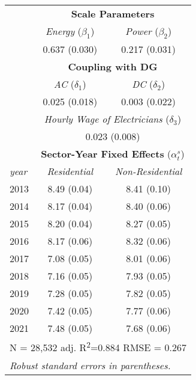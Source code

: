 \begin{tabular}{lcc} \hline
\Tstrut                       & \multicolumn{2}{c}{\textbf{Scale Parameters}}                    \\ \cline{2-3} 
\Tstrut   \Bstrut                    & \textit{Energy} ($\beta_1$)             & \textit{Power} ($\beta_2$)              \\
                      & 0.637 (0.030)                    & 0.217 (0.031)                     \\
[0.5em]
  & \multicolumn{2}{c}{\textbf{Coupling with DG}}                    \\ \cline{2-3} 
\Tstrut   \Bstrut & \textit{AC} ($\delta_1$) & \textit{DC} ($\delta_2$) \\
                      & 0.025 (0.018)                    & 0.003 (0.022)                     \\
[0.5em]
\Bstrut                    & \multicolumn{2}{c}{\textit{Hourly Wage of Electricians} ($\delta_3$)}                    \\
                      & \multicolumn{2}{c}{0.023 (0.008) }                                       \\
[0.5em]
                      & \multicolumn{2}{c}{\textbf{Sector-Year Fixed Effects} ($\alpha^s_t$)} \\ \cline{2-3} 
\textit{year}	\Tstrut \Bstrut  & \textit{Residential}                   & \textit{Non-Residential}            \\
2013                  &   8.49 (0.04)                         &        8.41 (0.10)                    \\
2014                  &   8.17 (0.04)                         &        8.40 (0.06)                    \\
2015                  &   8.20 (0.04)                         &        8.27 (0.05)                    \\
2016                  &   8.17 (0.06)                         &        8.32 (0.06)                    \\
2017                  &   7.08 (0.05)                         &        8.01 (0.06)                    \\
2018                  &   7.16 (0.05)                         &        7.93 (0.05)                    \\
2019                  &   7.28 (0.05)                         &        7.82 (0.05)                    \\
2020                  &   7.42 (0.05)                         &        7.77 (0.06)                    \\
2021                  &   7.48 (0.05)                         &        7.68 (0.06)                    \\ \cline{1-3} 
\multicolumn{3}{r}{\footnotesize \tstrut N = 28,532  \quad   adj. R\textsuperscript{2}=0.884   \quad  RMSE = 0.267}     \\  \cline{1-3}            
\multicolumn{3}{l}{\footnotesize \textit{Robust standard errors in parentheses.}}           
\end{tabular}
